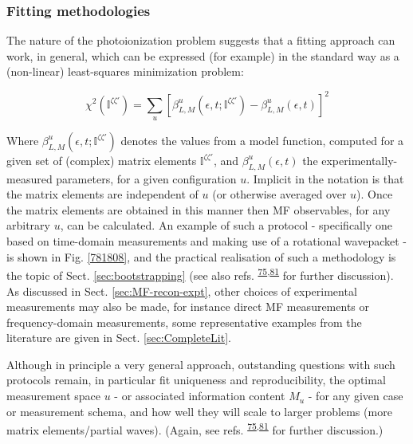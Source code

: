 \documentclass[10pt]{article}
\begin{document}
\subsubsection{Fitting methodologies\label{sec:fitting-intro}}

The nature of the photoionization problem suggests that a fitting approach can work, in general, which can be expressed (for example) in the standard way as a (non-linear) least-squares minimization problem:

\begin{equation}
\chi^{2}(\mathbb{I}^{\zeta\zeta'})=\sum_{u}\left[\beta^{u}_{L,M}(\epsilon,t;\mathbb{I}^{\zeta\zeta'})-\beta^{u}_{L,M}(\epsilon,t)\right]^{2}\label{eq:chi2-I}
\end{equation}

Where $\beta^{u}_{L,M}(\epsilon,t;\mathbb{I}^{\zeta\zeta'})$ denotes  the values from a model function, computed for a given set of (complex) matrix elements $\mathbb{I}^{\zeta\zeta'}$, and $\beta^{u}_{L,M}(\epsilon,t)$ the experimentally-measured parameters, for a given configuration $u$. Implicit in the notation is that the matrix elements are independent of $u$ (or otherwise averaged over $u$). Once the matrix elements are obtained in this manner then MF observables, for any arbitrary $u$, can be calculated. An example of such a protocol - specifically one based on time-domain measurements and making use of a rotational wavepacket - is shown in Fig. \ref{781808}, %
and the practical realisation of such a methodology is the topic of Sect. \ref{sec:bootstrapping} (see also refs. \textsuperscript{\hyperref[csl:75]{75},\hyperref[csl:81]{81}} for further discussion). As discussed in Sect. \ref{sec:MF-recon-expt}, other choices of experimental measurements may also be made, for instance direct MF measurements or frequency-domain measurements, some representative examples from the literature are given in Sect. \ref{sec:CompleteLit}. 

Although in principle a very general approach, outstanding questions with such protocols remain, in particular fit uniqueness and reproducibility, the optimal measurement space $u$ - or associated information content $M_u$ - for any given case or measurement schema, and how well they will scale to larger problems (more matrix elements/partial waves). (Again, see refs. \textsuperscript{\hyperref[csl:75]{75},\hyperref[csl:81]{81}} for further discussion.)
\end{document}
